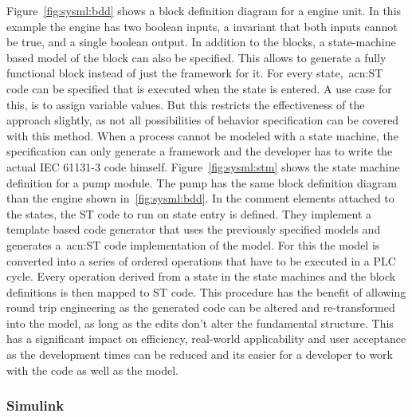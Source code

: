 Figure~\ref{fig:sysml:bdd} shows a block definition diagram for a engine unit.
In this example the engine has two boolean inputs, a invariant that both inputs cannot be true, and a single boolean output.
In addition to the blocks, a state-machine based model of the block can also be specified.
This allows to generate a fully functional block instead of just the framework for it.
For every state,~\acrshort{acn:ST} code can be specified that is executed when the state is entered.
A use case for this, is to assign variable values.
But this restricts the effectiveness of the approach slightly, as not all possibilities of behavior specification can be covered with this method.
When a process cannot be modeled with a state machine, the specification can only generate a framework and the developer has to write the actual IEC 61131-3 code himself.
Figure~\ref{fig:sysml:stm} shows the state machine definition for a pump module.
The pump has the same block definition diagram than the engine shown in~\ref{fig:sysml:bdd}.
In the comment elements attached to the states, the ST code to run on state entry is defined.
They implement a template based code generator that uses the previously specified models and generates a~\acrshort{acn:ST} code implementation of the model.
For this the model is converted into a series of ordered operations that have to be executed in a PLC cycle.
Every operation derived from a state in the state machines and the block definitions is then mapped to ST code.
This procedure has the benefit of allowing round trip engineering as the generated code can be altered and re-transformed into the model, as long as the edits don't alter the fundamental structure.
This has a significant impact on efficiency, real-world applicability and user acceptance as the development times can be reduced and its easier for a developer to work with the code as well as the model.

\subsubsection{Simulink}
\label{sec:sub:simulink}

